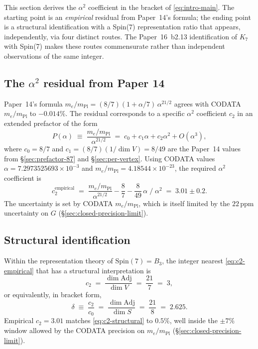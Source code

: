 \documentclass[11pt]{article}
\newcommand{\Spin}{\mathrm{Spin}}
\newcommand{\Adj}{\mathrm{Adj}}
\newcommand{\mPl}{m_{\mathrm{Pl}}}
\begin{document}
This section derives the $\alpha^2$ coefficient in the bracket of
\eqref{eq:intro-main}.  The starting point is an
\emph{empirical} residual from Paper~14's formula; the ending
point is a structural identification with a Spin(7) representation
ratio that appears, independently, via four distinct routes.  The
Paper~16~b2.13 identification of $K_7$ with Spin(7) makes these
routes commensurate rather than independent observations of the
same integer.

\subsection{The $\alpha^2$ residual from Paper 14}
\label{sec:alpha-squared-residual}

Paper~14's formula
$m_e/\mPl = (8/7)(1 + \alpha/7)\,\alpha^{21/2}$
agrees with CODATA $m_e/\mPl$ to $-0.014\%$.  The residual
corresponds to a specific $\alpha^2$ coefficient $c_2$ in an
extended prefactor of the form
\begin{equation}
  P(\alpha) \;\equiv\; \frac{m_e/\mPl}{\alpha^{21/2}}
             \;=\; c_0 + c_1 \alpha + c_2 \alpha^2 + O(\alpha^3),
  \label{eq:P-expansion}
\end{equation}
where $c_0 = 8/7$ and $c_1 = (8/7)(1/\dim V) = 8/49$ are the
Paper~14 values from \S\ref{sec:prefactor-87} and
\S\ref{sec:per-vertex}.  Using CODATA values
$\alpha = 7.2973525693 \times 10^{-3}$ and
$m_e/\mPl = 4.18544\times 10^{-23}$, the required $\alpha^2$
coefficient is
\begin{equation}
  c_2^{\text{empirical}}
  \;=\;
  \frac{m_e/\mPl}{\alpha^{21/2}} - \frac{8}{7} - \frac{8}{49}\,\alpha
  \;\Big/\; \alpha^2
  \;=\;
  3.01 \pm 0.2.
  \label{eq:c2-empirical}
\end{equation}
The uncertainty is set by CODATA $m_e/\mPl$, which is itself
limited by the $22$\,ppm uncertainty on $G$ (\S\ref{sec:closed-precision-limit}).

\subsection{Structural identification}
\label{sec:alpha-squared-structural}

Within the representation theory of $\Spin(7) = B_3$, the integer
nearest \eqref{eq:c2-empirical} that has a structural
interpretation is
\begin{equation}
  c_2 \;=\; \frac{\dim \Adj}{\dim V} \;=\; \frac{21}{7} \;=\; 3,
  \label{eq:c2-structural}
\end{equation}
or equivalently, in bracket form,
\begin{equation}
  \delta \;\equiv\; \frac{c_2}{c_0}
    \;=\; \frac{\dim \Adj}{\dim S}
    \;=\; \frac{21}{8} \;=\; 2.625.
  \label{eq:delta-structural}
\end{equation}
Empirical $c_2 = 3.01$ matches \eqref{eq:c2-structural} to
$0.5\%$, well inside the $\pm 7\%$ window allowed by the CODATA
precision on $m_e/\mPl$
(\S\ref{sec:closed-precision-limit}).
\end{document}
